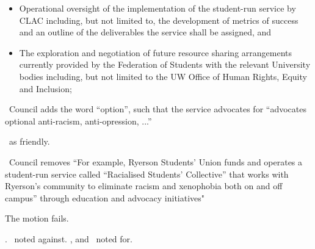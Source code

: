 \begin{motion}
\begin{motion}
\begin{itemize}
            \item Operational oversight of the implementation of the
                student-run service by CLAC including, but not limited to, the
                development of metrics of success and an outline of the
                deliverables the service shall be assigned, and

            \item The exploration and negotiation of future resource sharing
                arrangements currently provided by the Federation of Students
                with the relevant University bodies including, but not limited
                to the UW Office of Human Rights, Equity and Inclusion;
        \end{itemize}
    \end{motion}

    \begin{motion}
        \birt\ Council adds the word ``option'', such that the service 
        advocates for ``advocates optional anti-racism, anti-opression, ...''
        \movers{\alexander}{\seneca}

        \carries\ as friendly.
    \end{motion}

    \begin{motion}
        \birt\ Council removes ``For example, Ryerson Students’ Union funds and operates a student-run
        service called ``Racialised Students’ Collective'' that works with Ryerson’s
        community to eliminate racism and xenophobia both on and off campus'' through
        education and advocacy initiatives"
        \movers{\alexander}{\seneca}

        The motion fails.
    \end{motion}

    \carries. \harsh\ noted against. \nickta, and \alexander\ noted for.

\end{motion}
    
